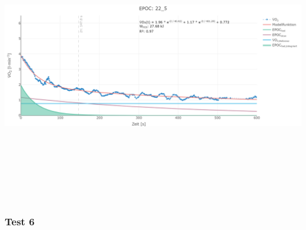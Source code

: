 \documentclass[
  letterpaper,
  DIV=11]{scrartcl}
\begin{document}
\includegraphics[width=11.45833in,height=4.6875in]{images/22_5.png}

\subsubsection{Test 6}
\end{document}
